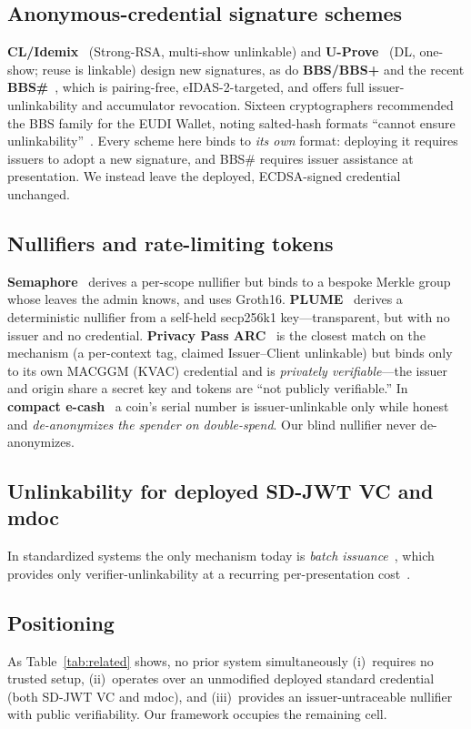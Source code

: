 \documentclass[11pt]{article}
\theoremstyle{plain}
\theoremstyle{definition}
\begin{document}
\subsection{Anonymous-credential signature schemes}
\textbf{CL/Idemix}~\cite{camenisch2001cl,camenisch2002cl} (Strong-RSA, multi-show
unlinkable) and \textbf{U-Prove}~\cite{brands2000,uprove-spec} (DL, one-show; reuse is
linkable) design new signatures, as do \textbf{BBS/BBS+} and the recent
\textbf{BBS\#}~\cite{bbs-sharp2025}, which is pairing-free, eIDAS-2-targeted, and offers
full issuer-unlinkability and accumulator revocation. Sixteen cryptographers
recommended the BBS family for the EUDI Wallet, noting salted-hash formats ``cannot
ensure unlinkability''~\cite{eudi-crypto-feedback}. Every scheme here binds to
\emph{its own} format: deploying it requires issuers to adopt a new signature, and
BBS\# requires issuer assistance at presentation. We instead leave the deployed,
ECDSA-signed credential unchanged.

\subsection{Nullifiers and rate-limiting tokens}
\textbf{Semaphore}~\cite{semaphore} derives a per-scope nullifier but binds to a
bespoke Merkle group whose leaves the admin knows, and uses Groth16.
\textbf{PLUME}~\cite{plume2022} derives a deterministic nullifier from a self-held
secp256k1 key---transparent, but with no issuer and no credential. \textbf{Privacy Pass
ARC}~\cite{arc-draft} is the closest match on the mechanism (a per-context tag, claimed
Issuer--Client unlinkable) but binds only to its own MACGGM (KVAC) credential and is
\emph{privately verifiable}---the issuer and origin share a secret key and tokens are
``not publicly verifiable.'' In \textbf{compact e-cash}~\cite{chl2005} a coin's serial
number is issuer-unlinkable only while honest and \emph{de-anonymizes the spender on
double-spend}. Our blind nullifier never de-anonymizes.

\subsection{Unlinkability for deployed SD-JWT VC and mdoc}
In standardized systems the only mechanism today is \emph{batch
issuance}~\cite{openid4vci,rfc9901,haip,eudi-arf}, which provides only
verifier-unlinkability at a recurring per-presentation cost~\cite{etsi119476}.

\subsection{Positioning}
As Table~\ref{tab:related} shows, no prior system simultaneously (i)~requires no
trusted setup, (ii)~operates over an unmodified deployed standard credential (both
SD-JWT VC and mdoc), and (iii)~provides an issuer-untraceable nullifier with public
verifiability. Our framework occupies the remaining cell.
\end{document}
